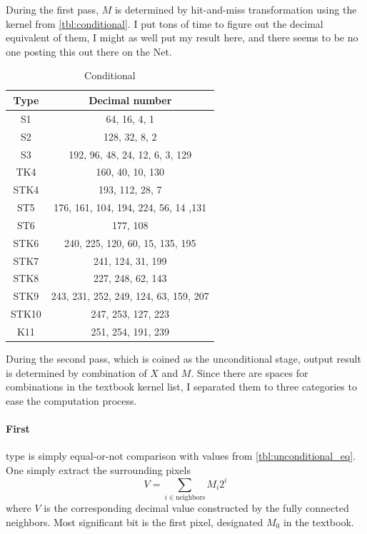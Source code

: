 \documentclass[12pt]{article}
\begin{document}
During the first pass, $M$ is determined by hit-and-miss transformation using the kernel from \autoref{tbl:conditional}. 
I put tons of time to figure out the decimal equivalent of them, I might as well put my result here, and there seems to be no one posting this out there on the Net.
\begin{table}[H]
\caption{Conditional}
	\centering
	\begin{tabular}{c|c}	
	Type & Decimal number \\
	\hline
	\hline
	S1 & 64, 16, 4, 1\\
	S2 & 128, 32, 8, 2\\
	S3 & 192, 96, 48, 24, 12, 6, 3, 129 \\
	TK4 & 160, 40, 10, 130 \\
	STK4 & 193, 112, 28, 7 \\
	ST5 & 176, 161, 104, 194, 224, 56, 14 ,131 \\
	ST6 & 177, 108 \\
	STK6 & 240, 225, 120, 60, 15, 135, 195 \\
	STK7 & 241, 124, 31, 199\\
	STK8 & 227, 248, 62, 143\\
	STK9 & 243, 231, 252, 249, 124, 63, 159, 207\\
	STK10 & 247, 253, 127, 223\\
	K11 & 251, 254, 191, 239\\
	\end{tabular}
	\label{tbl:conditional}
\end{table}

During the second pass, which is coined as the unconditional stage, output result is determined by combination of $X$ and $M$. 
Since there are spaces for combinations in the textbook kernel list, I separated them to three categories to ease the computation process.

\paragraph{First} type is simply equal-or-not comparison with values from \autoref{tbl:unconditional_eq}. One simply extract the surrounding pixels 
\begin{equation}
	V = \sum_{i\in\text{neighbors}}{M_i 2^i}
\end{equation}
where $V$ is the corresponding decimal value constructed by the fully connected neighbors.
Most significant bit is the first pixel, designated $M_0$ in the textbook.
\end{document}
